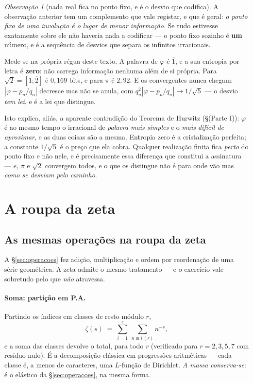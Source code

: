 \documentclass[11pt,a4paper]{article}
\theoremstyle{plain}
\theoremstyle{definition}
\theoremstyle{remark}
\newtheorem{obs}[teorema]{Observação}
\begin{document}
\begin{obs}[nada real fica no ponto fixo, e é o desvio que codifica]\label{obs:desvio}
A observação anterior tem um complemento que vale registar, e que é geral: \emph{o ponto fixo de
uma involução é o lugar de menor informação}. Se tudo estivesse exatamente sobre ele não haveria
nada a codificar --- o ponto fixo sozinho é \textbf{um} número, e é a sequência de desvios que
separa os infinitos irracionais.

Mede-se na própria régua deste texto. A palavra de $\varphi$ é $\overline{1}$, e a sua entropia por
letra é \textbf{zero}: não carrega informação nenhuma além de si própria. Para $\sqrt2 =
[1;\overline{2}]$ é $0{,}169$ bits, e para $\pi$ é $2{,}92$. E os convergentes nunca chegam:
$|\varphi - p_n/q_n|$ decresce mas não se anula, com $q_n^2|\varphi-p_n/q_n| \to 1/\sqrt5$ --- o
desvio \emph{tem lei}, e é a lei que distingue.

Isto explica, aliás, a aparente contradição do Teorema de Hurwitz (\S(Parte I)): $\varphi$ é
ao mesmo tempo o irracional de \emph{palavra mais simples} e o \emph{mais difícil de aproximar}, e
as duas coisas são a mesma. Entropia zero é a cristalização perfeita; a constante $1/\sqrt5$ é o
preço que ela cobra. Qualquer realização finita fica \emph{perto} do ponto fixo e não nele, e é
precisamente essa diferença que constitui a assinatura --- $e$, $\pi$ e $\sqrt2$ convergem todos,
e o que os distingue não é para onde vão mas \emph{como se desviam pelo caminho}.
\end{obs}


\section{A roupa da zeta}\label{sec:zetacap}

\subsection{As mesmas operações na roupa da zeta}\label{sec:zetaelastica}

A \S\ref{sec:operacoes} fez adição, multiplicação e ordem por reordenação de uma série geométrica.
A zeta admite o mesmo tratamento --- e o exercício vale sobretudo pelo que \emph{não} atravessa.

\paragraph{Soma: partição em P.A.} Partindo os índices em classes de resto módulo $r$,
\[
  \zeta(s) \;=\; \sum_{i=1}^{r} \ \sum_{n\equiv i \,(r)} n^{-s} ,
\]
e a soma das classes devolve o total, para todo $r$ (verificado para $r=2,3,5,7$ com resíduo nulo).
É a decomposição clássica em progressões aritméticas --- cada classe é, a menos de caracteres, uma
$L$-função de Dirichlet. \emph{A massa conserva-se}: é o elástico da \S\ref{sec:operacoes}, na
mesma forma.
\end{document}

